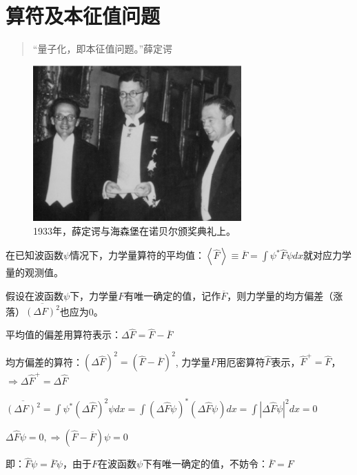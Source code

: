 \section{算符及本征值问题}

\begin{quotation}
``量子化，即本征值问题。''\qquad 薛定谔
\end{quotation}


\begin{figure}[h]
\begin{center}
\includegraphics[clip,width=8cm]{Operators/1933hei-sch.ps}
\caption{1933年，薛定谔与海森堡在诺贝尔颁奖典礼上。}
\end{center}
\end{figure}

在已知波函数$\psi$情况下，力学量算符的平均值：$\left\langle {\hat F} \right\rangle  \equiv \overline F  = \int {\psi ^* \hat F\psi dx} $就对应力学量的观测值。

假设在波函数$\psi$下，力学量$F$有唯一确定的值，记作$\overline F $，则力学量的均方偏差（涨落）$\overline {\left( {\Delta F} \right)^2 } $也应为0。

平均值的偏差用算符表示：$\Delta \hat F = \hat F - \overline F $

均方偏差的算符：$\left( {\Delta \hat F} \right)^2  = \left( {\hat F - \overline F } \right)^2 $, 力学量$F$用厄密算符$\hat F$表示，$\hat F^ +   = \hat F$，$ \Rightarrow \Delta \hat F^ +   = \Delta \hat F$

$\overline {\left( {\Delta F} \right)^2 }  = \int {\psi ^* \left( {\Delta \hat F} \right)^2 } \psi dx = \int {\left( {\Delta \hat F\psi } \right)^* \left( {\Delta \hat F\psi } \right)} dx = \int {\left| {\Delta \hat F\psi } \right|} ^2 dx = 0$

$\Delta \hat F\psi  = 0, \Rightarrow \left( {\hat F - \overline F } \right)\psi  = 0$

即：$\hat F\psi  = \overline F \psi $，由于$F$在波函数$\psi$下有唯一确定的值，不妨令：$\overline F  = F$


